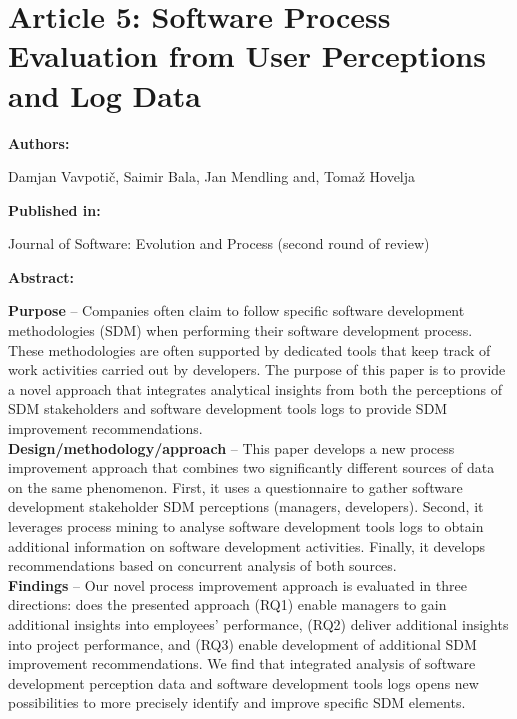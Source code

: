 
\chapter{Article 5: Software Process Evaluation from User Perceptions and Log Data}


{\bfseries \Large Authors: \medskip}

Damjan Vavpotič,
Saimir Bala,
Jan Mendling and,
Tomaž Hovelja \hfill

\bigskip

{\noindent\bfseries \Large Published in: \medskip}

Journal of Software: Evolution and Process (second round of review)

\bigskip

{\noindent\bfseries \Large Abstract: \medskip}


\noindent \textbf{Purpose} – Companies often claim to follow specific software development methodologies (SDM) when performing their software development process. These methodologies are often supported by dedicated tools that keep track of work activities carried out by developers. The purpose of this paper is to provide a novel approach that integrates analytical insights from both the perceptions of SDM stakeholders and software development tools logs to provide SDM improvement recommendations. \\

\noindent
\textbf{Design/methodology/approach} – This paper develops a new process improvement approach that combines two significantly different sources of data on the same phenomenon. First, it uses a questionnaire to gather software development stakeholder SDM perceptions (managers, developers). Second, it leverages process mining to analyse software development tools logs to obtain additional information on software development activities. Finally, it develops recommendations based on concurrent analysis of both sources. \\

\noindent
\textbf{Findings} – Our novel process improvement approach is evaluated in three directions: does the presented approach (RQ1) enable managers to gain additional insights into employees’ performance, (RQ2) deliver additional insights into project performance, and (RQ3) enable development of additional SDM improvement recommendations. We find that integrated analysis of software development perception data and software development tools logs opens new possibilities to more precisely identify and improve specific SDM elements.\\

